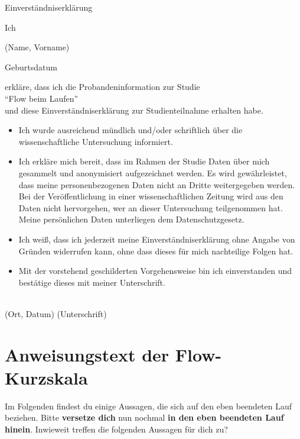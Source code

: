 {\Huge Einverständniserklärung}\\
\begin{singlespace}
	Ich \hrulefill 
	\begin{center}
		(Name, Vorname) 
	\end{center}
	Geburtsdatum \hrulefill 
	\begin{center}
		erkläre, dass ich die Probandeninformation zur Studie\\
		"`Flow beim Laufen"'\\
		und diese Einverständniserklärung zur Studienteilnahme erhalten habe. 
	\end{center}
	\begin{itemize}
		\item Ich wurde ausreichend mündlich und/oder schriftlich über die wissenschaftliche Untersuchung informiert. 
		\item Ich erkläre mich bereit, dass im Rahmen der Studie Daten über mich gesammelt und anonymisiert aufgezeichnet werden. Es wird gewährleistet, dass meine personenbezogenen Daten nicht an Dritte weitergegeben werden. Bei der Veröffentlichung in einer wissenschaftlichen Zeitung wird aus den Daten nicht hervorgehen, wer an dieser Untersuchung teilgenommen hat. Meine persönlichen Daten unterliegen dem Datenschutzgesetz. 
		\item Ich weiß, dass ich jederzeit meine Einverständniserklärung ohne Angabe von Gründen widerrufen kann, ohne dass dieses für mich nachteilige Folgen hat. 
		\item Mit der vorstehend geschilderten Vorgehensweise bin ich einverstanden und bestätige dieses mit meiner Unterschrift. 
	\end{itemize}
	\vspace{15mm} \hrulefill \\
	(Ort, Datum) \hspace{20mm} (Unterschrift) 
\end{singlespace}
\newpage

\section{Anweisungstext der Flow-Kurzskala} 

\label{sec:anweisungstext_der_flow_kurzskala}

Im Folgenden findest du einige Aussagen, die sich auf den eben beendeten Lauf beziehen. Bitte \textbf{versetze dich} nun nochmal \textbf{in den eben beendeten Lauf hinein}. Inwieweit treffen die folgenden Aussagen für dich zu?


